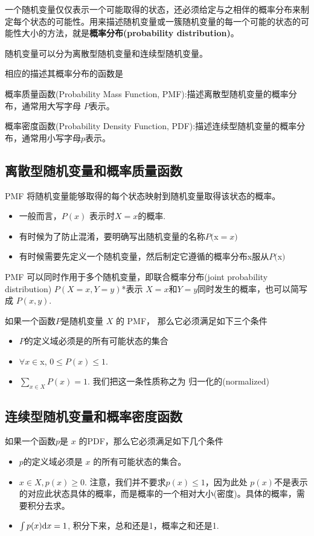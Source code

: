 一个随机变量仅仅表示一个可能取得的状态，还必须给定与之相伴的概率分布来制定每个状态的可能性。用来描述随机变量或一簇随机变量的每一个可能的状态的可能性大小的方法，就是{\bf 概率分布(probability distribution)}。

随机变量可以分为离散型随机变量和连续型随机变量。

相应的描述其概率分布的函数是 

概率质量函数(Probability Mass Function, PMF):描述离散型随机变量的概率分布，通常用大写字母 $P$表示。

概率密度函数(Probability Density Function, PDF):描述连续型随机变量的概率分布，通常用小写字母$p$表示。

\subsection{离散型随机变量和概率质量函数}

PMF 将随机变量能够取得的每个状态映射到随机变量取得该状态的概率。

\begin{itemize}\itemsep0em
		\item 一般而言，$P(x)$ 表示时$X=x$的概率.
		\item 有时候为了防止混淆，要明确写出随机变量的名称$P($x$=x)$ 
		\item 有时候需要先定义一个随机变量，然后制定它遵循的概率分布x服从$P($x$)$ 
\end{itemize}


PMF 可以同时作用于多个随机变量，即联合概率分布(joint probability distribution) $P(X=x,Y=y)$*表示 $X=x$和$Y=y$同时发生的概率，也可以简写成 $P(x,y)$.

如果一个函数$P$是随机变量 $X$ 的 PMF， 那么它必须满足如下三个条件

\begin{itemize}\itemsep0em
		\item $P$的定义域必须是的所有可能状态的集合
		\item $∀x∈$x, $0 \leq P(x) \leq 1 $. 
		\item $∑_{x∈X} P(x)=1$. 我们把这一条性质称之为 归一化的(normalized)
\end{itemize}

\subsection{连续型随机变量和概率密度函数}

如果一个函数$p$是 $x$ 的PDF，那么它必须满足如下几个条件

\begin{itemize}\itemsep0em
		\item $p$的定义域必须是 $x$ 的所有可能状态的集合。
		\item $x\in X,p(x)\ge 0$. 注意，我们并不要求$p(x)\le 1$，因为此处 $p(x)$不是表示的对应此状态具体的概率，而是概率的一个相对大小(密度)。具体的概率，需要积分去求。
		\item $\int p(x)\mathrm{d}x=1$, 积分下来，总和还是1，概率之和还是1.
\end{itemize}


